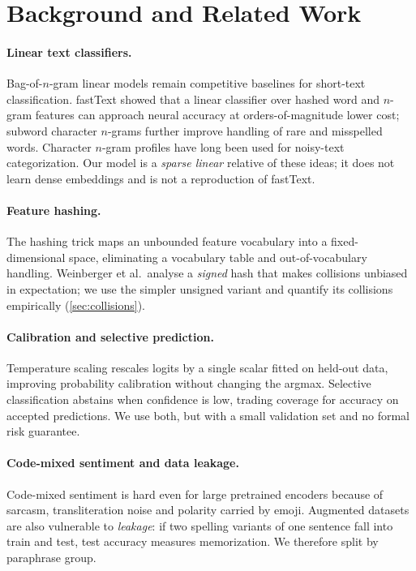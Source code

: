 \documentclass[11pt,a4paper]{article}
\theoremstyle{remark}
\begin{document}
\section{Background and Related Work}
\label{sec:related}

\paragraph{Linear text classifiers.}
Bag-of-$n$-gram linear models remain competitive baselines for short-text
classification. fastText showed
that a linear classifier over hashed word and $n$-gram features can approach
neural accuracy at orders-of-magnitude lower cost; subword character
$n$-grams further improve handling of rare and misspelled
words. Character $n$-gram profiles have long
been used for noisy-text categorization. Our model is a
\emph{sparse linear} relative of these ideas; it does not learn dense
embeddings and is not a reproduction of fastText.

\paragraph{Feature hashing.}
The hashing trick maps an unbounded feature
vocabulary into a fixed-dimensional space, eliminating a vocabulary table and
out-of-vocabulary handling. Weinberger et al.\ analyse a \emph{signed} hash
that makes collisions unbiased in expectation; we use the simpler unsigned
variant and quantify its collisions empirically (\cref{sec:collisions}).

\paragraph{Calibration and selective prediction.}
Temperature scaling rescales logits by a single
scalar fitted on held-out data, improving probability calibration without
changing the argmax. Selective classification abstains when confidence is low, trading coverage for
accuracy on accepted predictions. We use both, but with a small validation
set and no formal risk guarantee.

\paragraph{Code-mixed sentiment and data leakage.}
Code-mixed sentiment is hard even for large pretrained encoders because of
sarcasm, transliteration noise and polarity carried by emoji.
Augmented datasets are also vulnerable to \emph{leakage}:
if two spelling variants of one sentence fall into train and test, test
accuracy measures memorization. We therefore split by paraphrase group.
\end{document}
